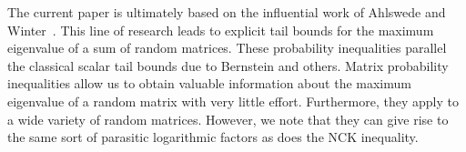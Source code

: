 \documentclass[11pt,letterpaper,twoside,reqno,nosumlimits]{amsart}
\theoremstyle{remark}
\numberwithin{equation}{section}
\numberwithin{thm}{section}
\numberwithin{prop}{section}
\numberwithin{defn}{section}
\numberwithin{remark}{section}
\begin{document}
The current paper is ultimately based on the influential work of Ahlswede and Winter~\cite{AW02}. This line of research leads to explicit tail bounds for the maximum eigenvalue of a sum of random matrices. These probability inequalities parallel the classical scalar tail bounds due to Bernstein and others. Matrix probability inequalities allow us to obtain valuable information about the maximum eigenvalue of a random matrix with very little effort. Furthermore, they apply to a wide variety of random matrices. However, we note that they can give rise to the same sort of parasitic logarithmic factors as does the NCK inequality.



\end{document}
